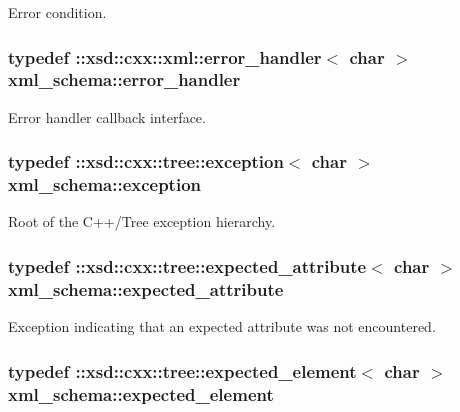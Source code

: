 Error condition. 

\hypertarget{namespacexml__schema_abdee01986b8e16f04af47dd12038261e}{
\subsubsection[{error\+\_\+handler}]{\setlength{\rightskip}{0pt plus 5cm}typedef \+::xsd\+::cxx\+::xml\+::error\+\_\+handler$<$ char $>$ {\bf xml\+\_\+schema\+::error\+\_\+handler}}}\label{namespacexml__schema_abdee01986b8e16f04af47dd12038261e}


Error handler callback interface. 

\hypertarget{namespacexml__schema_a7eb0fa6af3de36ea17011d26a731b62b}{
\subsubsection[{exception}]{\setlength{\rightskip}{0pt plus 5cm}typedef \+::xsd\+::cxx\+::tree\+::exception$<$ char $>$ {\bf xml\+\_\+schema\+::exception}}}\label{namespacexml__schema_a7eb0fa6af3de36ea17011d26a731b62b}


Root of the C++/\+Tree exception hierarchy. 

\hypertarget{namespacexml__schema_ad8a9d3a09372da61ab6ba78c4de87a26}{
\subsubsection[{expected\+\_\+attribute}]{\setlength{\rightskip}{0pt plus 5cm}typedef \+::xsd\+::cxx\+::tree\+::expected\+\_\+attribute$<$ char $>$ {\bf xml\+\_\+schema\+::expected\+\_\+attribute}}}\label{namespacexml__schema_ad8a9d3a09372da61ab6ba78c4de87a26}


Exception indicating that an expected attribute was not encountered. 

\hypertarget{namespacexml__schema_a4b608c951db27c574552da0bda062e1a}{
\subsubsection[{expected\+\_\+element}]{\setlength{\rightskip}{0pt plus 5cm}typedef \+::xsd\+::cxx\+::tree\+::expected\+\_\+element$<$ char $>$ {\bf xml\+\_\+schema\+::expected\+\_\+element}}}\label{namespacexml__schema_a4b608c951db27c574552da0bda062e1a}


